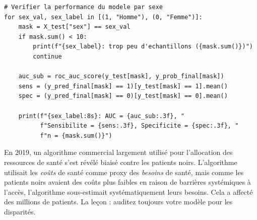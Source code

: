 \begin{verbatim}
# Verifier la performance du modele par sexe
for sex_val, sex_label in [(1, "Homme"), (0, "Femme")]:
    mask = X_test["sex"] == sex_val
    if mask.sum() < 10:
        print(f"{sex_label}: trop peu d'echantillons ({mask.sum()})")
        continue

    auc_sub = roc_auc_score(y_test[mask], y_prob_final[mask])
    sens = (y_pred_final[mask] == 1)[y_test[mask] == 1].mean()
    spec = (y_pred_final[mask] == 0)[y_test[mask] == 0].mean()

    print(f"{sex_label:8s}: AUC = {auc_sub:.3f}, "
          f"Sensibilite = {sens:.3f}, Specificite = {spec:.3f}, "
          f"n = {mask.sum()}")
\end{verbatim}

\begin{clinicalnote}
En 2019, un algorithme commercial largement utilis\'e pour l'allocation des ressources de sant\'e s'est r\'ev\'el\'e biais\'e contre les patients noirs. L'algorithme utilisait les \emph{co\^uts} de sant\'e comme proxy des \emph{besoins} de sant\'e, mais comme les patients noirs avaient des co\^uts plus faibles en raison de barri\`eres syst\'emiques \`a l'acc\`es, l'algorithme sous-estimait syst\'ematiquement leurs besoins. Cela a affect\'e des millions de patients. La le\c{c}on : auditez toujours votre mod\`ele pour les disparit\'es.
\end{clinicalnote}

